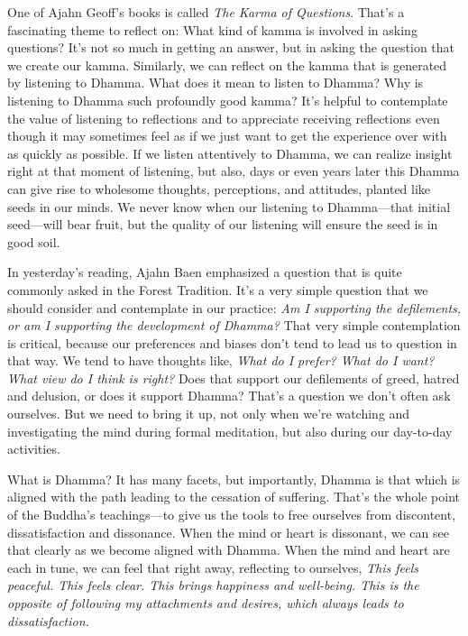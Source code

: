 One of Ajahn Geoff's books is called \emph{The Karma of Questions}. 
That's a fascinating theme to reflect on: What kind of kamma is 
involved in asking questions? It's not so much in getting an answer, 
but in asking the question that we create our kamma. Similarly, we can 
reflect on the kamma that is generated by listening to Dhamma. What 
does it mean to listen to Dhamma? Why is listening to Dhamma such 
profoundly good kamma? It's helpful to contemplate the value of 
listening to reflections and to appreciate receiving reflections even 
though it may sometimes feel as if we just want to get the experience 
over with as quickly as possible. If we listen attentively to Dhamma, 
we can realize insight right at that moment of listening, but also, 
days or even years later this Dhamma can give rise to wholesome 
thoughts, perceptions, and attitudes, planted like seeds in our minds. 
We never know when our listening to Dhamma---that initial seed---will 
bear fruit, but the quality of our listening will ensure the seed is in 
good soil.


In yesterday's reading, Ajahn Baen emphasized a question that is quite 
commonly asked in the Forest Tradition. It's a very simple question 
that we should consider and contemplate in our practice: \emph{Am I 
supporting the defilements, or am I supporting the development of 
Dhamma?} That very simple contemplation is critical, because our 
preferences and biases don't tend to lead us to question in that way. 
We tend to have thoughts like, \emph{What do I prefer? What do I want? 
What view do I think is right?} Does that support our defilements of 
greed, hatred and delusion, or does it support Dhamma? That's a 
question we don't often ask ourselves. But we need to bring it up, not 
only when we're watching and investigating the mind during formal 
meditation, but also during our day-to-day activities.

What is Dhamma? It has many facets, but importantly, Dhamma is that 
which is aligned with the path leading to the cessation of suffering. 
That's the whole point of the Buddha's teachings---to give us the tools 
to free ourselves from discontent, dissatisfaction and dissonance. When 
the mind or heart is dissonant, we can see that clearly as we become 
aligned with Dhamma. When the mind and heart are each in tune, we can 
feel that right away, reflecting to ourselves, \emph{This feels 
peaceful. This feels clear. This brings happiness and well-being. This 
is the \mbox{opposite} of following my attachments and desires, which always 
leads to dissatisfaction.}

